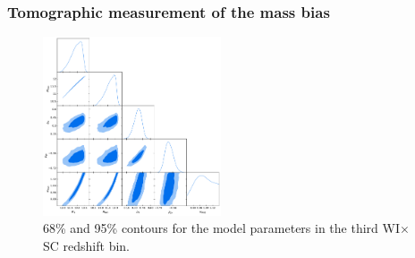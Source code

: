 \documentclass[useAMS,usenatbib]{mn2e}
\begin{document}
    \subsubsection{Tomographic measurement of the mass bias}\label{ssec:results.fid.1mb}
      \begin{figure}
        \centering
        \includegraphics[width=0.47\textwidth]{fiducial_wisc3.pdf}
        \caption{68\% and 95\% contours for the model parameters in the third WI$\times$SC redshift bin.}
        \label{fig:triangle}
      \end{figure}
\end{document}
